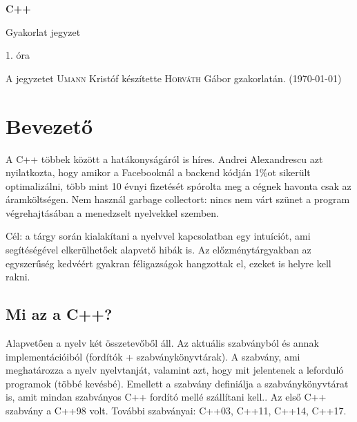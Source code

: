 \documentclass[a4paper,11.5pt]{article}
\begin{document}
	\setlength\parindent{0pt}
	\def\s{\hspace{0.2mm}\vphantom{\beta}}
	\def\Z{\mathbb{Z}}
	\def\Q{\mathbb{Q}}
	\def\R{\mathbb{R}}
	\def\C{\mathbb{C}}
	\def\N{\mathbb{N}}
	\def\Ra{\overline{\mathbb{R}}}
	
	\def\sume{\displaystyle\sum_{n=1}^{+\infty}}
	\def\sumn{\displaystyle\sum_{n=0}^{+\infty}}
	
	\def\narrow{\underset{n\rightarrow+\infty}{\longrightarrow}}
	\def\limn{\displaystyle\lim_{n\to +\infty}}
	\def\limx{\displaystyle\lim_{x\to +\infty}}
	
	\theoremstyle{definition}
	\newtheorem{theorem}{Tétel}[subsection] 
	
	\theoremstyle{definition}
	\newtheorem{definition}[theorem]{Definíció} 
	\newtheorem{example}[theorem]{Példa} 
	\newtheorem{task}[theorem]{Feladat} 
	\newtheorem{note}[theorem]{Megjegyzés}
	\begin{center}
		{\LARGE\textbf{C++}}
		
		{\Large Gyakorlat jegyzet}
		
		1. óra
	\end{center}
	A jegyzetet \textsc{Umann} Kristóf készítette \textsc{Horváth} Gábor gzakorlatán. (\today)
	\section{Bevezető}
	A C++ többek között a hatákonyságáról is híres. Andrei Alexandrescu azt nyilatkozta, hogy amikor a Facebooknál a backend kódján 1\%ot sikerült optimalizálni, több mint 10 évnyi fizetését spórolta meg a cégnek havonta csak az áramköltségen. Nem használ garbage collectort: nincs nem várt szünet a program végrehajtásában a menedzselt nyelvekkel szemben.
	
	\medskip
	Cél: a tárgy során kialakítani a nyelvvel kapcsolatban egy intuíciót, ami segítéségével elkerülhetőek alapvető hibák is. Az előzménytárgyakban az egyszerűség kedvéért gyakran féligazságok hangzottak el, ezeket is helyre kell rakni.
	\subsection{Mi az a C++?}
  Alapvetően a nyelv két összetevőből áll. Az aktuális szabványból és annak implementációiból (fordítók + szabványkönyvtárak). A szabvány, ami meghatározza a nyelv nyelvtanját, valamint azt, hogy mit jelentenek a leforduló programok (többé kevésbé). Emellett a szabvány definiálja a szabványkönyvtárat is, amit mindan szabványos C++ fordító mellé szállítani kell.. Az első C++ szabvány a {C++98} volt. További szabványai: {C++03}, {C++11}, {C++14}, {C++17}.
	
\end{document}
